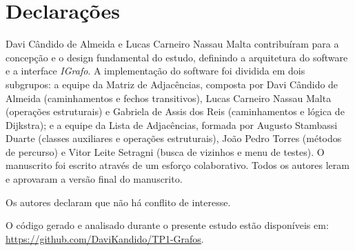 \documentclass{sbc2023}%
\begin{document}
\section*{Declarações}

\begin{contributions}
Davi Cândido de Almeida e Lucas Carneiro Nassau Malta contribuíram para a concepção e o design fundamental do estudo, definindo a arquitetura do software e a interface \textit{IGrafo}. A implementação do software foi dividida em dois subgrupos: a equipe da Matriz de Adjacências, composta por Davi Cândido de Almeida (caminhamentos e fechos transitivos), Lucas Carneiro Nassau Malta (operações estruturais) e Gabriela de Assis dos Reis (caminhamentos e lógica de Dijkstra); e a equipe da Lista de Adjacências, formada por Augusto Stambassi Duarte (classes auxiliares e operações estruturais), João Pedro Torres (métodos de percurso) e Vitor Leite Setragni (busca de vizinhos e menu de testes). O manuscrito foi escrito através de um esforço colaborativo. Todos os autores leram e aprovaram a versão final do manuscrito.
\end{contributions}

\begin{interests}
Os autores declaram que não há conflito de interesse.
\end{interests}

\begin{materials}
O código gerado e analisado durante o presente estudo estão disponíveis em: \url{https://github.com/DaviKandido/TP1-Grafos}.
\end{materials}



\end{document}
